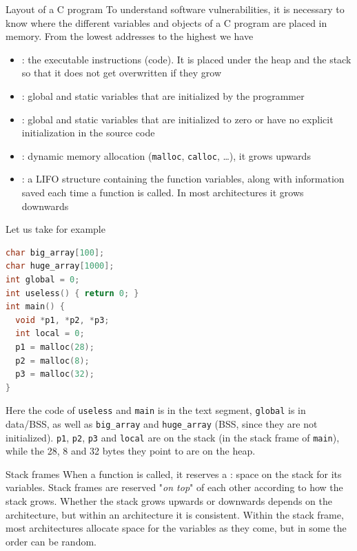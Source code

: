 \begin{parag}{Layout of a C program}
    To understand software vulnerabilities, it is necessary to know where the different variables and objects of a C program are placed in memory. From the lowest addresses to the highest we have
    \begin{itemize}
        \item {}: the executable instructions (code). It is placed under the heap and the stack so that it does not get overwritten if they grow
        \item {}: global and static variables that are initialized by the programmer
        \item {}: global and static variables that are initialized to zero or have no explicit initialization in the source code
        \item {}: dynamic memory allocation (\texttt{malloc}, \texttt{calloc}, \dots), it grows upwards
        \item {}: a LIFO structure containing the function variables, along with information saved each time a function is called. In most architectures it grows downwards
    \end{itemize}
    Let us take for example
    \begin{lstlisting}[language=C]
char big_array[100];
char huge_array[1000];
int global = 0;
int useless() { return 0; }
int main() {
  void *p1, *p2, *p3;
  int local = 0;
  p1 = malloc(28);
  p2 = malloc(8);
  p3 = malloc(32);
}
    \end{lstlisting}
    Here the code of \texttt{useless} and \texttt{main} is in the text segment, \texttt{global} is in data/BSS, as well as \texttt{big\_array} and \texttt{huge\_array} (BSS, since they are not initialized). \texttt{p1}, \texttt{p2}, \texttt{p3} and \texttt{local} are on the stack (in the stack frame of \texttt{main}), while the 28, 8 and 32 bytes they point to are on the heap.
    \begin{subparag}{Stack frames}
        When a function is called, it reserves a : space on the stack for its variables. Stack frames are reserved "\textit{on top}" of each other according to how the stack grows. Whether the stack grows upwards or downwards depends on the architecture, but within an architecture it is consistent. Within the stack frame, most architectures allocate space for the variables as they come, but in some the order can be random.
    \end{subparag}
\end{parag}

